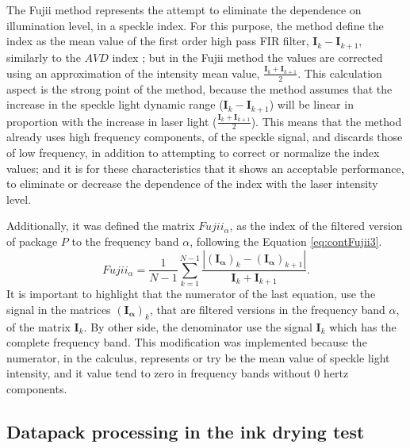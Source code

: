 \documentclass[review]{elsarticle}
\begin{document}
The Fujii method represents the attempt to eliminate 
the dependence on illumination level, in a speckle index.
For this purpose, the method define the index as the mean value of the  first order high pass FIR filter, 
$\mathbf{I}_{k}-\mathbf{I}_{k+1}$, similarly to the  $AVD$ index \cite{avd};
but in the Fujii method the values are corrected using an approximation of the intensity mean value, $\frac{\mathbf{I}_{k}+\mathbf{I}_{k+1}}{2}$.
This calculation aspect is the strong point of the method,
because the method assumes that the increase in the speckle 
light dynamic range ($\mathbf{I}_{k}-\mathbf{I}_{k+1}$) 
will be linear in proportion with the increase in laser light ($\frac{\mathbf{I}_{k}+\mathbf{I}_{k+1}}{2}$).
This means that the method already uses high frequency components, 
of the speckle signal, 
and discards those of low frequency, 
in addition to attempting to correct or  normalize the index values;
and it is for these characteristics that it shows an acceptable performance,
to eliminate or decrease the dependence of the index with the laser intensity level.

Additionally, it was defined the matrix $Fujii_{\alpha}$, 
as the index of the filtered version of package $P$ to the frequency band $\alpha$, following the Equation \ref{eq:contFujii3}.
\begin{equation}\label{eq:contFujii3}
Fujii_{\alpha}  = \frac{1}{N-1} \sum_{k=1}^{N-1} \frac{|\mathbf{(I_{\alpha})}_{k}-\mathbf{(I_{\alpha})}_{k+1}|}{\mathbf{I}_{k}+\mathbf{I}_{k+1}}.
\end{equation}
It is important to highlight that the numerator of the last equation, 
use the signal in the matrices $\mathbf{(I_{\alpha})}_{k}$, that are filtered versions in the frequency band $\alpha$,
of the matrix $\mathbf{I}_{k}$. 
By other side, the denominator use the signal $\mathbf{I}_{k}$ which has the complete frequency band.
This modification was implemented because the numerator, in the calculus, 
represents or try be the mean value of speckle light intensity, 
and it value tend to zero in frequency bands without 0 hertz components.


\subsection{Datapack processing in the ink drying test}
\label{subsec:numprocink}
\end{document}
